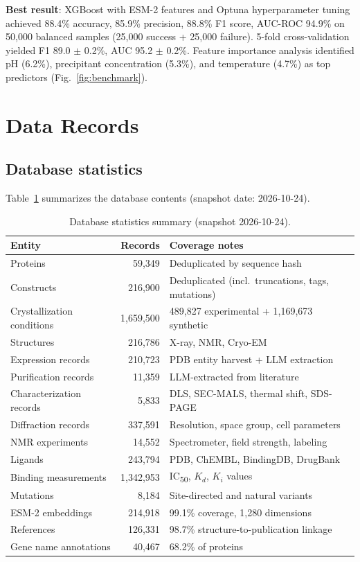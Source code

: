 \documentclass[11pt]{article}
\begin{document}
\textbf{Best result}: XGBoost with ESM-2 features and Optuna hyperparameter tuning achieved 88.4\% accuracy, 85.9\% precision, 88.8\% F1 score, AUC-ROC 94.9\% on 50,000 balanced samples (25,000 success + 25,000 failure). 5-fold cross-validation yielded F1 89.0 $\pm$ 0.2\%, AUC 95.2 $\pm$ 0.2\%. Feature importance analysis identified pH (6.2\%), precipitant concentration (5.3\%), and temperature (4.7\%) as top predictors (Fig.~\ref{fig:benchmark}).

\section*{Data Records}

\subsection*{Database statistics}

Table~\ref{tab:statistics} summarizes the database contents (snapshot date: 2026-10-24).

\begin{table}[H]
\centering
\caption{Database statistics summary (snapshot 2026-10-24).}
\label{tab:statistics}
\small
\begin{tabular}{lrl}
\toprule
\textbf{Entity} & \textbf{Records} & \textbf{Coverage notes} \\
\midrule
Proteins & 59,349 & Deduplicated by sequence hash \\
Constructs & 216,900 & Deduplicated (incl.\ truncations, tags, mutations) \\
Crystallization conditions & 1,659,500 & 489,827 experimental + 1,169,673 synthetic \\
Structures & 216,786 & X-ray, NMR, Cryo-EM \\
Expression records & 210,723 & PDB entity harvest + LLM extraction \\
Purification records & 11,359 & LLM-extracted from literature \\
Characterization records & 5,833 & DLS, SEC-MALS, thermal shift, SDS-PAGE \\
Diffraction records & 337,591 & Resolution, space group, cell parameters \\
NMR experiments & 14,552 & Spectrometer, field strength, labeling \\
Ligands & 243,794 & PDB, ChEMBL, BindingDB, DrugBank \\
Binding measurements & 1,342,953 & IC\textsubscript{50}, $K_d$, $K_i$ values \\
Mutations & 8,184 & Site-directed and natural variants \\
ESM-2 embeddings & 214,918 & 99.1\% coverage, 1,280 dimensions \\
References & 126,331 & 98.7\% structure-to-publication linkage \\
Gene name annotations & 40,467 & 68.2\% of proteins \\
\bottomrule
\end{tabular}
\end{table}
\end{document}
